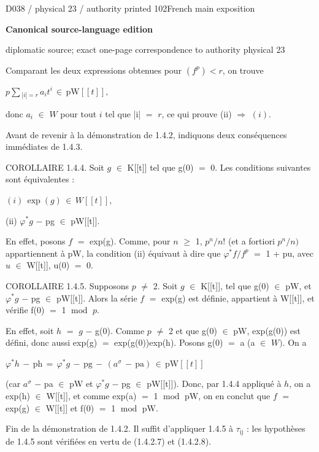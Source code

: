 \documentclass[9pt]{article}
\newcommand{\CanonText}[1]{\par{\fontsize{8.0}{9.35}\selectfont\RaggedRight #1\par}\vspace{2.2pt}}
\newcommand{\CanonDisplay}[1]{\par\vspace{1.2pt}\begin{center}{\fontsize{7.2}{8.4}\selectfont\(\displaystyle #1\)}\end{center}\vspace{1.2pt}}
\newcommand{\LayerTitle}{Canonical source-language edition}
\begin{document}
\noindent\begin{minipage}[t][\dimexpr\textheight-5pt\relax][t]{\textwidth}
{\sffamily\fontsize{7.3}{8.2}\selectfont\color{Quiet} D038 / physical 23 / authority printed 102\hfill French main exposition}
\par{}\vspace{4.5pt}
{\sffamily\fontsize{10.4}{11.6}\selectfont\bfseries\color{Accent} \LayerTitle}
\par{\sffamily\fontsize{6.7}{7.7}\selectfont\color{Quiet} diplomatic source; exact one-page correspondence to authority physical 23}
\vspace{5pt}
\CanonText{Comparant les deux expressions obtenues pour \((f^{p})<r\), on trouve}
\CanonDisplay{p\sum{}_{|i|=r}\,a_{i}t^{i}\,\in{}\,\text{pW}[[t]],}
\CanonText{donc \(a_{i}\) \(\in{}\) \(W\) pour tout \(i\) tel que |i| \(=\) \(r\), ce qui prouve (ii) \(\Rightarrow{}\) \((i)\).}
\CanonText{Avant de revenir à la démonstration de 1.4.2, indiquons deux conséquences immédiates de 1.4.3.}
\CanonText{COROLLAIRE 1.4.4. Soit \(g\) \(\in{}\) K[[t]] tel que g(0) \(=\) 0. Les conditions suivantes sont équivalentes :}
\CanonDisplay{(i)\,\operatorname{exp}(g)\,\in{}\,W[[t]],}
\CanonText{(ii) \(\varphi{}^{*}g\) \(-\) pg \(\in{}\) pW[[t]].}
\CanonText{En effet, posons \(f\) \(=\) exp(g). Comme, pour \(n\) \(\geq{}\) 1, \(p^{n}/n\)! (et a fortiori \(p^{n}/n)\) appartiennent à pW, la condition (ii) équivaut à dire que \(\varphi{}^{*}f/f^{p}\) \(=\) 1 + pu, avec \(u\) \(\in{}\) W[[t]], u(0) \(=\) 0.}
\CanonText{COROLLAIRE 1.4.5. Supposons \(p\) \(\neq{}\) 2. Soit \(g\) \(\in{}\) K[[t]], tel que g(0) \(\in{}\) pW, et \(\varphi{}^{*}g\) \(-\) pg \(\in{}\) pW[[t]]. Alors la série \(f\) \(=\) exp(g) est définie, appartient à W[[t]], et vérifie f(0) \(=\) 1 \(\operatorname{mod}\) \(p\).}
\CanonText{En effet, soit \(h\) \(=\) \(g\) \(-\) g(0). Comme \(p\) \(\neq{}\) 2 et que g(0) \(\in{}\) pW, exp(g(0)) est défini, donc aussi exp(g) \(=\) exp(g(0))exp(h). Posons g(0) \(=\) a (a \(\in{}\) \(W)\). On a}
\CanonDisplay{\varphi{}^{*}h\,-\,\text{ph}\,=\,\varphi{}^{*}g\,-\,\text{pg}\,-\,(a^\sigma{}\,-\,\text{pa})\,\in{}\,\text{pW}[[t]]}
\CanonText{(car \(a^\sigma{}\) \(-\) pa \(\in{}\) pW et \(\varphi{}^{*}g\) \(-\) pg \(\in{}\) pW[[t]]). Donc, par 1.4.4 appliqué à \(h\), on a exp(h) \(\in{}\) W[[t]], et comme exp(a) \(=\) 1 \(\operatorname{mod}\) pW, on en conclut que \(f\) \(=\) exp(g) \(\in{}\) W[[t]] et f(0) \(=\) 1 \(\operatorname{mod}\) pW.}
\CanonText{Fin de la démonstration de 1.4.2. Il suffit d'appliquer 1.4.5 à \(\tau{}_{\mathrm{ij}}\) : les hypothèses de 1.4.5 sont vérifiées en vertu de (1.4.2.7) et (1.4.2.8).}

\end{minipage}
\end{document}
